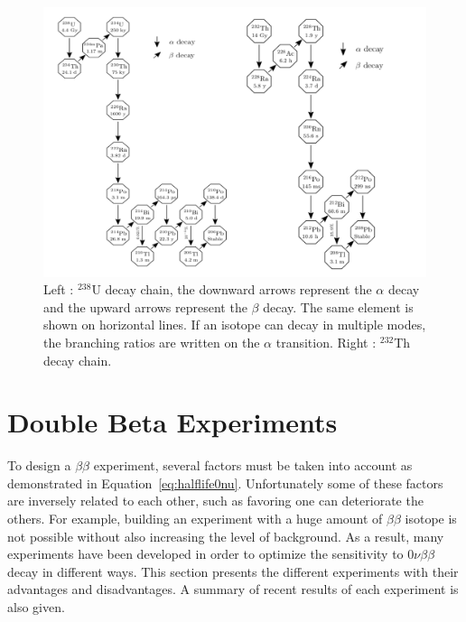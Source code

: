 \documentclass[main.tex]{subfiles}
\begin{document}
\begin{figure}[h!]
\begin{center}
\includegraphics[scale=0.40]{pictures/Chap2/u238-th232decayChain.pdf}
\caption{Left : $^{238}$U decay chain, the downward arrows represent the $\alpha$ decay and the upward arrows represent the $\beta$ decay. The same element is shown on horizontal lines. If an isotope can decay in multiple modes, the branching ratios are written on the $\alpha$ transition. Right : $^{232}$Th decay chain.}
\label{u238-th232decayChain}
\end{center}
\end{figure}


\FloatBarrier


\section{Double Beta Experiments}\label{sec:DBDexperiment}


\NI To design a $\beta\beta$ experiment, several factors must be taken into account as demonstrated in Equation~\ref{eq:halflife0nu}. Unfortunately some of these factors are inversely related to each other, such as favoring one can deteriorate the others. For example, building an experiment with a huge amount of $\beta\beta$ isotope is not possible without also increasing the level of background. As a result, many experiments have been developed in order to optimize the sensitivity to 0$\nu\beta\beta$ decay in different ways. This section presents the different experiments with their advantages and disadvantages. A summary of recent results of each experiment is also given.
\end{document}

